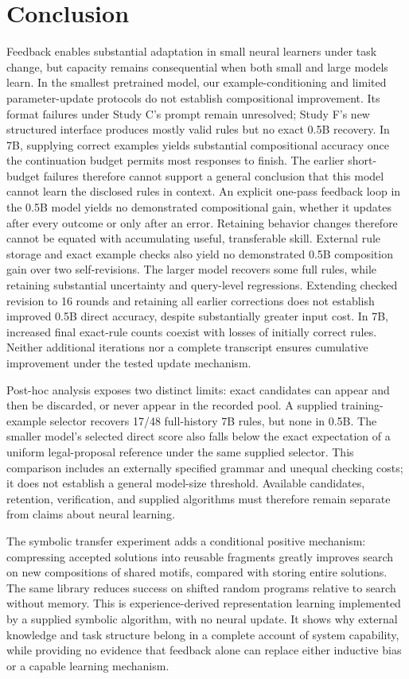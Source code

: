 \documentclass[11pt]{article}
\begin{document}
\section{Conclusion}
Feedback enables substantial adaptation in small neural learners under task
change, but capacity remains consequential when both small and large models
learn. In the smallest pretrained model, our example-conditioning and limited
parameter-update protocols do not establish compositional improvement. Its
format failures under Study C's prompt remain unresolved; Study F's new
structured interface produces mostly valid rules but no exact 0.5B recovery.
In 7B, supplying correct examples yields
substantial compositional accuracy once the continuation budget permits most
responses to finish. The earlier short-budget failures therefore cannot support
a general conclusion that this model cannot learn the disclosed rules in context.
An explicit one-pass feedback loop in the 0.5B model yields no demonstrated
compositional gain, whether it updates after every outcome or only after an
error. Retaining behavior changes therefore cannot be equated with accumulating
useful, transferable skill. External rule storage and exact example checks
also yield no demonstrated 0.5B composition gain over two self-revisions.
The larger model recovers some full rules, while retaining substantial
uncertainty and query-level regressions. Extending checked revision to 16
rounds and retaining all earlier corrections does not establish improved
0.5B direct accuracy, despite substantially greater input cost. In 7B,
increased final exact-rule counts coexist with losses of initially correct
rules. Neither additional iterations nor a complete transcript ensures
cumulative improvement under the tested update mechanism.

Post-hoc analysis exposes two distinct limits: exact candidates can appear
and then be discarded, or never appear in the recorded pool. A supplied
training-example selector recovers 17/48 full-history 7B rules, but none in
0.5B. The smaller model's selected direct score also falls below the exact
expectation of a uniform legal-proposal reference under the same supplied
selector. This comparison includes an externally specified grammar and
unequal checking costs; it does not establish a general model-size threshold.
Available candidates, retention, verification, and supplied algorithms must
therefore remain separate from claims about neural learning.

The symbolic transfer experiment adds a conditional positive mechanism:
compressing accepted solutions into reusable fragments greatly improves search
on new compositions of shared motifs, compared with storing entire solutions.
The same library reduces success on shifted random programs relative to
search without memory. This is experience-derived representation learning
implemented by a supplied symbolic algorithm, with no neural update. It shows
why external knowledge and task structure belong in a complete account of
system capability, while providing no evidence that feedback alone can replace
either inductive bias or a capable learning mechanism.
\end{document}
